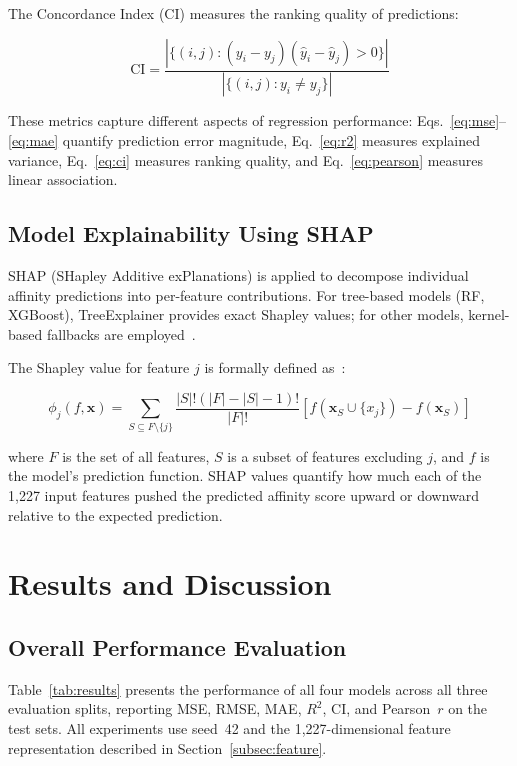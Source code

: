 \documentclass[10pt,conference]{IEEEtran}
\begin{document}
The Concordance Index (CI) measures the ranking quality of predictions:

\begin{equation}
\text{CI} = \frac{|\{(i,j) : (y_i - y_j)(\hat{y}_i - \hat{y}_j) > 0\}|}{|\{(i,j) : y_i \neq y_j\}|}
\label{eq:ci}
\end{equation}

These metrics capture different aspects of regression performance: Eqs.~\eqref{eq:mse}--\eqref{eq:mae} quantify prediction error magnitude, Eq.~\eqref{eq:r2} measures explained variance, Eq.~\eqref{eq:ci} measures ranking quality, and Eq.~\eqref{eq:pearson} measures linear association.

\subsection{Model Explainability Using SHAP}
\label{subsec:shap}

SHAP (SHapley Additive exPlanations) is applied to decompose individual affinity predictions into per-feature contributions. For tree-based models (RF, XGBoost), TreeExplainer provides exact Shapley values; for other models, kernel-based fallbacks are employed~\cite{treeshap2020}.

The Shapley value for feature $j$ is formally defined as~\cite{shap2017}:

\begin{equation}
\phi_j(f, \mathbf{x}) = \sum_{S \subseteq F \setminus \{j\}} \frac{|S|!(|F| - |S| - 1)!}{|F|!} \left[f(\mathbf{x}_S \cup \{x_j\}) - f(\mathbf{x}_S)\right]
\label{eq:shap}
\end{equation}

where $F$ is the set of all features, $S$ is a subset of features excluding $j$, and $f$ is the model's prediction function. SHAP values quantify how much each of the 1,227 input features pushed the predicted affinity score upward or downward relative to the expected prediction.

\section{Results and Discussion}
\label{sec:results}

\subsection{Overall Performance Evaluation}
\label{subsec:overall}

Table~\ref{tab:results} presents the performance of all four models across all three evaluation splits, reporting MSE, RMSE, MAE, $R^2$, CI, and Pearson~$r$ on the test sets. All experiments use seed~42 and the 1,227-dimensional feature representation described in Section~\ref{subsec:feature}.
\end{document}
